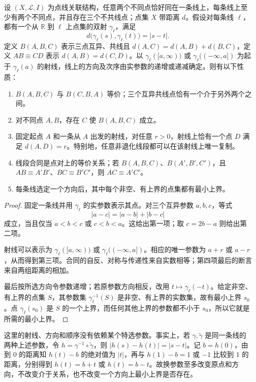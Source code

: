 \begin{proposition}
	\label{g1:prop:axiom-line-parameter}
	设 \((X,\mathcal L,I)\) 为点线关联结构，任意两个不同点恰好同在一条线上，每条线上至少有两个不同点，并且存在三个不共线点；点集 \(X\) 带距离 \(d\)。假设对每条线 \(\ell\)，都有一个从 \(\mathbb R\) 到 \(\ell\) 上点集的双射 \(\gamma_\ell\)，满足
	\[
		d\bigl(\gamma_\ell(s),\gamma_\ell(t)\bigr)=|s-t|.
	\]
	定义 \(B(A,B,C)\) 表示三点互异、共线且 \(d(A,C)=d(A,B)+d(B,C)\)，定义 \(AB\equiv CD\) 表示 \(d(A,B)=d(C,D)\)。以 \(\gamma_\ell([a,\infty))\) 或 \(\gamma_\ell(({-\infty},a])\) 为起于 \(\gamma_\ell(a)\) 的射线，线上的方向及次序由实参数的递增或递减确定。则有以下性质：
	\begin{enumerate}
		\item \(B(A,B,C)\) 与 \(B(C,B,A)\) 等价；三个互异共线点恰有一个介于另外两个之间。
		\item 对不同点 \(A,B\)，存在 \(C\) 使 \(B(A,B,C)\) 成立。
		\item 固定起点 \(A\) 和一条从 \(A\) 出发的射线，对任意 \(r>0\)，射线上恰有一个点 \(D\) 满足 \(d(A,D)=r\)。特别地，任意非退化线段都可以在该射线上唯一复制。
		\item 线段合同是点对上的等价关系；若 \(B(A,B,C)\)、\(B(A',B',C')\)，且 \(AB\equiv A'B'\)、\(BC\equiv B'C'\)，则 \(AC\equiv A'C'\)。
		\item 每条线选定一个方向后，其中每个非空、有上界的点集都有最小上界。
	\end{enumerate}
\end{proposition}
\begin{proof}
	固定一条线并用 \(\gamma_\ell\) 的实参数表示其点。对三个互异参数 \(a,b,c\)，等式
	\[
		|a-c|=|a-b|+|b-c|
	\]
	成立，当且仅当 \(a<b<c\) 或 \(c<b<a\)。这给出第一项；取 \(c=2b-a\) 则给出第二项。

	射线可以表示为 \(\gamma_\ell([a,\infty))\) 或 \(\gamma_\ell(({-\infty},a])\)。相应的唯一参数为 \(a+r\) 或 \(a-r\)，从而得到第三项。合同的自反、对称与传递性来自实数相等；第四项最后的断言来自两组距离的相加。

	最后按所选方向令参数递增；若原参数方向相反，改用 \(t\mapsto\gamma_\ell(-t)\)。给定非空、有上界的点集 \(S\)，其参数集 \(\gamma_\ell^{-1}(S)\) 是非空、有上界的实数集，故有最小上界 \(s_0\)。点 \(\gamma_\ell(s_0)\) 是 \(S\) 的一个上界，而任何其他上界的参数都不小于 \(s_0\)，所以它就是所需的最小上界。
\end{proof}

这里的射线、方向和顺序没有依赖某个特选参数。事实上，若 \(\gamma,\widetilde\gamma\) 是同一条线的两种上述参数，令 \(h=\gamma^{-1}\circ\widetilde\gamma\)，则 \(|h(s)-h(t)|=|s-t|\)。记 \(b=h(0)\)，由到 \(0\) 的距离知 \(h(t)-b\) 的绝对值为 \(|t|\)，再与 \(h(1)-b=1\) 或 \(-1\) 比较到 \(1\) 的距离，分别得到 \(h(t)=b+t\) 或 \(h(t)=b-t\)。故换参数至多改变原点和方向，不改变介于关系，也不改变一个方向上最小上界是否存在。

